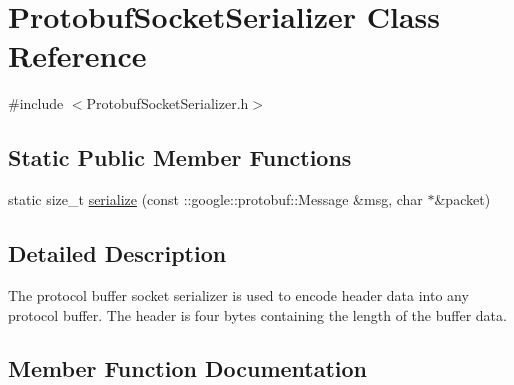 \hypertarget{class_protobuf_socket_serializer}{}\section{Protobuf\+Socket\+Serializer Class Reference}
\label{class_protobuf_socket_serializer}


{\ttfamily \#include $<$Protobuf\+Socket\+Serializer.\+h$>$}

\subsection*{Static Public Member Functions}
\begin{DoxyCompactItemize}
\item 
static size\+\_\+t \hyperlink{class_protobuf_socket_serializer_a37206eb18b2b1300b8fab46acd82bdde}{serialize} (const \+::google\+::protobuf\+::\+Message \&msg, char $\ast$\&packet)
\end{DoxyCompactItemize}


\subsection{Detailed Description}
The protocol buffer socket serializer is used to encode header data into any protocol buffer. The header is four bytes containing the length of the buffer data. 

\subsection{Member Function Documentation}

